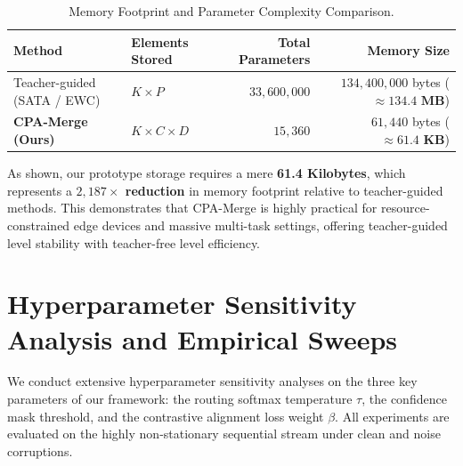 \documentclass{article}
\theoremstyle{plain}
\theoremstyle{definition}
\theoremstyle{remark}
\begin{document}
\begin{table}[h]
\caption{Memory Footprint and Parameter Complexity Comparison.}
\label{tab:storage-comparison}
\vskip 0.1in
\begin{center}
\begin{small}
\begin{tabular}{llrr}
\toprule
Method & Elements Stored & Total Parameters & Memory Size \\
\midrule
Teacher-guided (SATA / EWC) & $K \times P$ & $33,600,000$ & $134,400,000$ bytes ($\approx \mathbf{134.4\text{ MB}}$) \\
\textbf{CPA-Merge (Ours)} & $K \times C \times D$ & $15,360$ & $61,440$ bytes ($\approx \mathbf{61.4\text{ KB}}$) \\
\bottomrule
\end{tabular}
\end{small}
\end{center}
\end{table}

As shown, our prototype storage requires a mere \textbf{61.4 Kilobytes}, which represents a \textbf{$2,187\times$ reduction} in memory footprint relative to teacher-guided methods. This demonstrates that CPA-Merge is highly practical for resource-constrained edge devices and massive multi-task settings, offering teacher-guided level stability with teacher-free level efficiency.

\section{Hyperparameter Sensitivity Analysis and Empirical Sweeps}
\label{appendix-sweeps}

We conduct extensive hyperparameter sensitivity analyses on the three key parameters of our framework: the routing softmax temperature $\tau$, the confidence mask threshold, and the contrastive alignment loss weight $\beta$. All experiments are evaluated on the highly non-stationary sequential stream under clean and noise corruptions.
\end{document}
